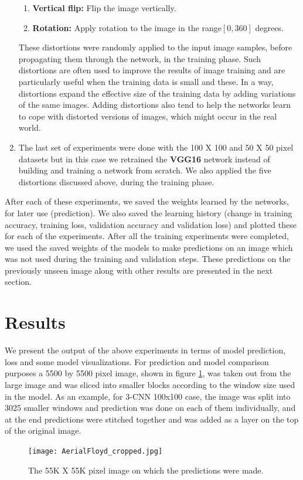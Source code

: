 \documentclass{sigkddExp}
\begin{document}
\begin{enumerate}
\begin{enumerate}
 \item \textbf{Vertical flip: } Flip the image vertically.
 \item \textbf{Rotation:} Apply rotation to the image in the range$[0,360]$ degrees.
 \end{enumerate}
These distortions were randomly applied to the input image samples, before propagating them through the network, in the training phase. Such distortions are often used to improve the results of image training and are particularly useful when the training data is small and these. In a way, distortions expand the effective size of the training data by adding variations of the same images. Adding distortions also tend to help the networks learn to cope with distorted versions of images, which might occur in the real world.  
\item The last set of experiments were done with the 100 X 100 and 50 X 50 pixel datasets but in this case we retrained the \textbf{VGG16} network instead of building and training a network from scratch. We also applied the five distortions discussed above, during the training phase. 
\end{enumerate}
After each of these experiments, we saved the weights learned by the networks, for later use (prediction). We also saved the learning history (change in training accuracy, training loss, validation accuracy and validation loss) and plotted these for each of the experiments. After all the training experiments were completed, we used the saved weights of the models to make predictions on an image which was not used during the training and validation steps. These predictions on the previously unseen image along with other results are presented in the next section.   
\section{Results}
We present the output of the above experiments in terms of model prediction, loss and some model visualizations. For prediction and model comparison purposes a 5500 by 5500 pixel image, shown in figure \ref{fig:55}, was taken out from the large image and was sliced into smaller blocks according to the window size used in the model. As an example, for 3-CNN 100x100 case, the image was split into 3025 smaller windows and prediction was done on each of them individually, and at the end predictions were stitched together and was added as a layer on the top of the original image. 

\begin{figure}[ht!]
\centering
  \texttt{[image: AerialFloyd\_cropped.jpg]}
  \caption{The 55K X 55K pixel image on which the predictions were made.}
  \label{fig:55}
\end{figure}
\end{document}

